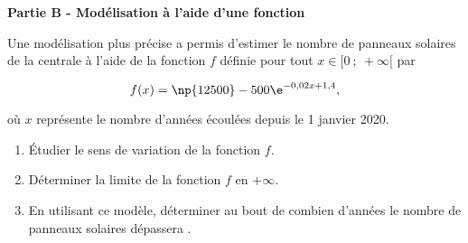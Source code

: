 \bigskip

\textbf{Partie B - Modélisation à l'aide d'une fonction}

\medskip

Une modélisation plus précise a permis d'estimer le nombre de panneaux solaires de la centrale à l'aide de la fonction $f$ définie pour tout $x \in [0~;~ +\infty[$ par 

\[f(x) = \np{12500} - 500 \e^{-0,02x+1,4},\]

 où $x$ représente le nombre d'années écoulées depuis le 1 janvier 2020.

\medskip

\begin{enumerate}
\item Étudier le sens de variation de la fonction $f$.
\item Déterminer la limite de la fonction $f$ en $+\infty$.
\item En utilisant ce modèle, déterminer au bout de combien d'années le nombre de panneaux
solaires dépassera .
\end{enumerate}

\bigskip

